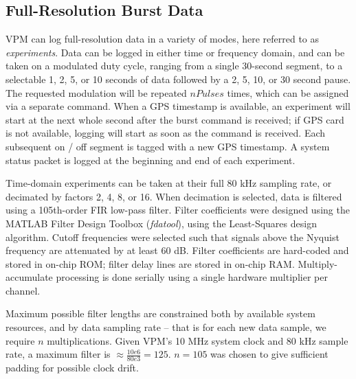 


\subsection{Full-Resolution Burst Data}

VPM can log full-resolution data in a variety of modes, here referred to as \emph{experiments}. Data can be logged in either time or frequency domain, and can be taken on a modulated duty cycle, ranging from a single 30-second segment, to a selectable 1, 2, 5, or 10 seconds of data followed by a 2, 5, 10, or 30 second pause. The requested modulation will be repeated $nPulses$ times, which can be assigned via a separate command. When a GPS timestamp is available, an experiment will start at the next whole second after the burst command is received; if GPS card is not available, logging will start as soon as the command is received. Each subsequent on / off segment is tagged with a new GPS timestamp. A system status packet is logged at the beginning and end of each experiment.

Time-domain experiments can be taken at their full 80 kHz sampling rate, or decimated by factors 2, 4, 8, or 16. When decimation is selected, data is filtered using a 105th-order FIR low-pass filter. Filter coefficients were designed using the MATLAB Filter Design Toolbox (\emph{fdatool}), using the Least-Squares design algorithm. Cutoff frequencies were selected such that signals above the Nyquist frequency are attenuated by at least 60 dB. Filter coefficients are hard-coded and stored in on-chip ROM; filter delay lines are stored in on-chip RAM. Multiply-accumulate processing is done serially using a single hardware multiplier per channel. 

Maximum possible filter lengths are constrained both by available system resources, and by data sampling rate -- that is for each new data sample, we require $n$ multiplications. Given VPM's 10 MHz system clock and 80 kHz sample rate, a maximum filter is $\approx \frac{10e6}{80e3} = 125 $. $n=105$ was chosen to give sufficient padding for possible clock drift.

